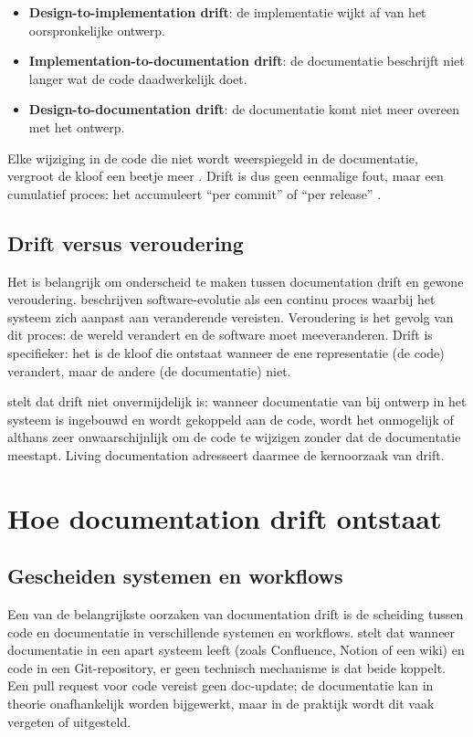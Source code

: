 \begin{itemize}
    \item \textbf{Design-to-implementation drift}: de implementatie wijkt af van het oorspronkelijke ontwerp.
    \item \textbf{Implementation-to-documentation drift}: de documentatie beschrijft niet langer wat de code daadwerkelijk doet.
    \item \textbf{Design-to-documentation drift}: de documentatie komt niet meer overeen met het ontwerp.
\end{itemize}

Elke wijziging in de code die niet wordt weerspiegeld in de documentatie, vergroot de kloof een beetje meer \autocite{romeo2024didrift}. Drift is dus geen eenmalige fout, maar een cumulatief proces: het accumuleert ``per commit'' of ``per release'' \autocite{whiting2020drifterosion}.

\subsection{Drift versus veroudering}
Het is belangrijk om onderscheid te maken tussen documentation drift en gewone veroudering. \textcite{tripathy2014softwareevolution} beschrijven software-evolutie als een continu proces waarbij het systeem zich aanpast aan veranderende vereisten. Veroudering is het gevolg van dit proces: de wereld verandert en de software moet meeveranderen. Drift is specifieker: het is de kloof die ontstaat wanneer de ene representatie (de code) verandert, maar de andere (de documentatie) niet.

\textcite{martraire2019livingdocumentation} stelt dat drift niet onvermijdelijk is: wanneer documentatie van bij ontwerp in het systeem is ingebouwd en wordt gekoppeld aan de code, wordt het onmogelijk of althans zeer onwaarschijnlijk om de code te wijzigen zonder dat de documentatie meestapt. Living documentation adresseert daarmee de kernoorzaak van drift.

\section{Hoe documentation drift ontstaat}
\label{sec:drift-oorzaken}

\subsection{Gescheiden systemen en workflows}
Een van de belangrijkste oorzaken van documentation drift is de scheiding tussen code en documentatie in verschillende systemen en workflows. \textcite{gentle2017docslikecode} stelt dat wanneer documentatie in een apart systeem leeft (zoals Confluence, Notion of een wiki) en code in een Git-repository, er geen technisch mechanisme is dat beide koppelt. Een pull request voor code vereist geen doc-update; de documentatie kan in theorie onafhankelijk worden bijgewerkt, maar in de praktijk wordt dit vaak vergeten of uitgesteld.

